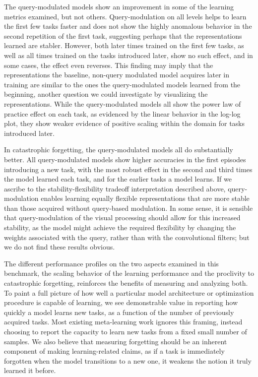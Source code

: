 The query-modulated models show an improvement in some of the learning metrics examined, but not others. Query-modulation on all levels helps to learn the first few tasks faster and does not show the highly anomalous behavior in the second repetition of the first task, suggesting perhaps that the representations learned are stabler. However, both later times trained on the first few tasks, as well as all times trained on the tasks introduced later, show no such effect, and in some cases, the effect even reverses. This finding may imply that the representations the baseline, non-query modulated model acquires later in training are similar to the ones the query-modulated models learned from the beginning, another question we could investigate by visualizing the representations. While the query-modulated models all show the power law of practice effect on each task, as evidenced by the linear behavior in the log-log plot, they show weaker evidence of positive scaling within the domain for tasks introduced later. 

In catastrophic forgetting, the query-modulated models all do substantially better. All query-modulated models show higher accuracies in the first episodes introducing a new task, with the most robust effect in the second and third times the model learned each task, and for the earlier tasks a model learns. If we ascribe to the stability-flexibility tradeoff interpretation described above, query-modulation enables learning equally flexible representations that are more stable than those acquired without query-based modulation. In some sense, it is sensible that query-modulation of the visual processing should allow for this increased stability, as the model might achieve the required flexibility by changing the weights associated with the query, rather than with the convolutional filters; but we do not find these results obvious. 

The different performance profiles on the two aspects examined in this benchmark, the scaling behavior of the learning performance and the proclivity to catastrophic forgetting, reinforces the benefits of measuring and analyzing both. To paint a full picture of how well a particular model architecture or optimization procedure is capable of learning, we see demonstrable value in reporting how quickly a model learns new tasks, as a function of the number of previously acquired tasks.  Most existing meta-learning work ignores this framing, instead choosing to report the capacity to learn new tasks from a fixed small number of samples. We also believe that measuring forgetting should be an inherent component of making learning-related claims, as if a task is immediately forgotten when the model transitions to a new one, it weakens the notion it truly learned it before. 

